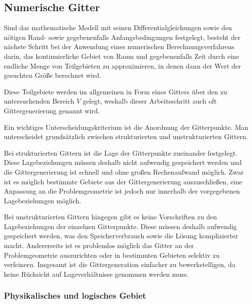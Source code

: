 \subsection{Numerische Gitter}
\label{sec:num_gitter}

Sind das mathematische Modell mit seinen Differentialgleichungen sowie den nötigen
Rand- sowie gegebenenfalls Anfangsbedingungen festgelegt, besteht der nächste Schritt
bei der Anwendung eines numerischen Berechnungsverfahrens darin, das kontinuierliche
Gebiet von Raum und gegebenenfalls Zeit durch eine endliche Menge von Teilgebieten zu approximieren,
in denen dann der Wert der gesuchten Größe berechnet wird.

Diese Teilgebiete werden im allgemeinen in Form eines Gitters über den zu untersuchenden
Bereich $V$ gelegt, weshalb dieser Arbeitsschritt auch oft Gittergenerierung genannt wird.

Ein wichtiges Unterscheidungskriterium ist die Anordnung der Gitterpunkte.
Man unterscheidet grundsätzlich zwischen strukturierten und unstrukturierten Gittern.

Bei strukturierten Gittern ist die Lage der Gitterpunkte zueinander festgelegt. Diese
Lagebeziehungen müssen deshalb nicht aufwendig gespeichert werden und die Gittergenerierung
ist schnell und ohne großen Rechenaufwand möglich. Zwar ist es möglich bestimmte Gebiete
aus der Gittergenerierung auszuschließen, eine Anpassung an die Problemgeometrie ist
jedoch nur innerhalb der vorgegebenen Lagebeziehungen möglich.

Bei unstrukturierten Gittern hingegen gibt es keine Vorschriften zu den Lagebeziehungen
der einzelnen Gitterpunkte. Diese müssen deshalb aufwendig gespeichert werden, was
den Speicherverbrauch sowie die Lösung komplizierter macht. Andererseits ist es problemlos möglich
das Gitter an der Problemgeometrie auszurichten oder in bestimmten Gebieten selektiv zu verfeinern.
Insgesamt ist die Gittergeneration einfacher zu bewerkstelligen, da keine Rücksicht auf Lageverhältnisse
genommen werden muss.

\subsubsection{Physikalisches und logisches Gebiet}


